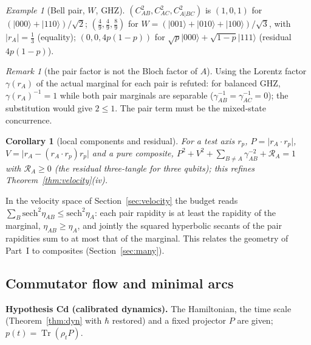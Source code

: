 \documentclass[aps,pra,onecolumn,superscriptaddress,nofootinbib,10pt]{revtex4-2}
\newtheorem{corollary}[theorem]{Corollary}
\theoremstyle{definition}
\theoremstyle{remark}
\newtheorem{remark}[theorem]{Remark}
\newtheorem{example}[theorem]{Example}
\newcommand{\tr}{\operatorname{Tr}}
\begin{document}
\begin{example}[Bell pair, $W$, GHZ]\label{ex:bdbudget}
$(C_{AB}^2,C_{AC}^2,C_{A|BC}^2)$ is $(1,0,1)$ for $(\lvert000\rangle+\lvert110\rangle)/\sqrt2$; $(\tfrac49,\tfrac49,\tfrac89)$ for $W=(\lvert001\rangle+\lvert010\rangle+\lvert100\rangle)/\sqrt3$, with $\lvert r_A\rvert=\tfrac13$ (equality);
$(0,0,4p(1-p))$ for $\sqrt p\lvert000\rangle+\sqrt{1-p}\lvert111\rangle$ (residual $4p(1-p)$).
\end{example}

\begin{remark}[the pair factor is not the Bloch factor of $A$]\label{rem:bdghz}
Using the Lorentz factor $\gamma(r_A)$ of the actual marginal for each pair is refuted: for balanced GHZ, $\gamma(r_A)^{-1}=1$
while both pair marginals are separable ($\gamma_{AB}^{-1}=\gamma_{AC}^{-1}=0$); the substitution would give $2\le1$.  The pair term must be the
mixed-state concurrence.
\end{remark}

\begin{corollary}[local components and residual]\label{cor:bdlocal}
For a test axis $r_p$, $P=\lvert r_A\cdot r_p\rvert$, $V=\lvert r_A-(r_A\cdot r_p)r_p\rvert$ and a pure composite, $P^2+V^2+\sum_{B\ne A}\gamma_{AB}^{-2}+\mathcal R_A=1$ with $\mathcal R_A\ge0$ (the residual
three-tangle for three qubits); this refines Theorem~\ref{thm:velocity}(iv).
\end{corollary}
\noindent In the velocity space of Section~\ref{sec:velocity} the budget reads $\sum_B\mathrm{sech}^2\eta_{AB}\le\mathrm{sech}^2\eta_A$: each pair rapidity is at least the
rapidity of the marginal, $\eta_{AB}\ge\eta_A$, and jointly the squared hyperbolic secants of the pair rapidities sum to at
most that of the marginal.
This relates the geometry of Part~I to composites (Section~\ref{sec:many}).

\subsection{Commutator flow and minimal arcs}\label{sec:bdrates}

\smallskip\noindent\textbf{Hypothesis Cd (calibrated dynamics).}\label{hyp:Cd}  The Hamiltonian, the time scale (Theorem~\ref{thm:dyn} with $\hbar$
restored) and a fixed projector $P$ are given; $p(t)=\tr(\rho_tP)$.
\end{document}
